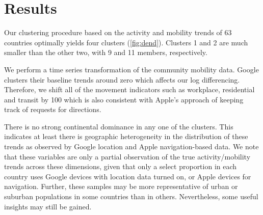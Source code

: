 \documentclass[preprint, 11pt]{elsarticle}
\newcommand{\?}{\stackrel{?}{=}}
\begin{document}





\section{Results }
Our clustering procedure based on the activity and mobility trends of 63 countries optimally yields four clusters (\autoref{fig:dend}).
Clusters 1 and 2 are much smaller than the other two, with 9 and 11 members, respectively.

We perform a time series transformation of the community mobility data. Google clusters their baseline trends around zero which affects our log differencing.
Therefore, we shift all of the movement indicators such as workplace, residential and transit by 100 which is also consistent with Apple's approach of keeping track of requests for directions.

There is no strong continental dominance in any one of the clusters.
This indicates at least there is geographic heterogeneity in the distribution of these trends as observed by Google location and Apple navigation-based data.
We note that these variables are only a partial observation of the true activity/mobility trends across these dimensions, given that only a select proportion in each country uses Google devices with location data turned on, or Apple devices for navigation.
Further, these samples may be more representative of urban or suburban populations in some countries than in others.
Nevertheless, some useful insights may still be gained.
\end{document}
